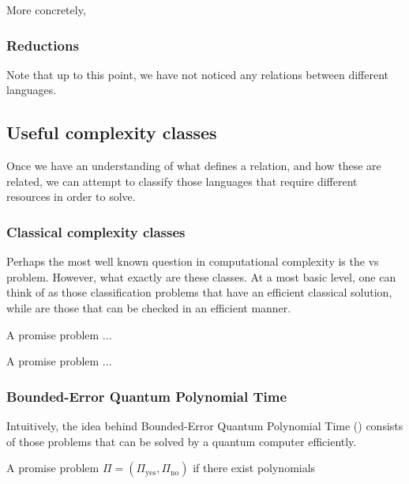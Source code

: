 \documentclass[../thesis-main/thesis-main]{subfiles}
\begin{document}
More concretely, 


\subsubsection{Reductions}

Note that up to this point, we have not noticed any relations between different languages.  


\subsection{Useful complexity classes}

Once we have an understanding of what defines a relation, and how these are related, we can attempt to classify those languages that require different resources in order to solve.

\subsubsection{Classical complexity classes}

  Perhaps the most well known question in computational complexity is the \PP vs \NP problem.  However, what exactly are these classes.  At a most basic level, one can think of \PP as those classification problems that have an efficient classical solution, while \NP are those that can be checked in an efficient manner.  


\begin{definition}[\PP]
  A promise problem ...
\end{definition}

\begin{definition}[\NP]
  A promise problem ...
\end{definition}


\subsubsection{Bounded-Error Quantum Polynomial Time}

Intuitively, the idea behind Bounded-Error Quantum Polynomial Time (\BQP) consists of those problems that can be solved by a quantum computer efficiently.


\begin{definition}[\BQP] A promise problem $\Pi = (\Pi_{\text{yes}},\Pi_{\text{no}})$ if there exist polynomials 
\end{definition}
\end{document}
